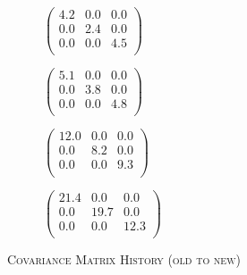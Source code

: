 \documentclass[english, master, utf8]{base/thesis_KBS}
\begin{document}
\begin{figure}[H]
    \begin{subfigure}[b]{0.24\textwidth}
    \centering
        $\left(
        \begin{array}{rrr}
        \boldsymbol{4.2} & 0.0 & 0.0 \\
        0.0 & \boldsymbol{2.4} & 0.0 \\
        0.0 & 0.0 & \boldsymbol{4.5} \\
        \end{array} \right) $
        \caption{\textsc{}}
        \label{fig:oldest}
    \end{subfigure}
    \hfill
    \begin{subfigure}[b]{0.24\textwidth}
    \centering
        $\left(
        \begin{array}{rrr}
        \boldsymbol{5.1} & 0.0 & 0.0 \\
        0.0 & \boldsymbol{3.8} & 0.0 \\
        0.0 & 0.0 & \boldsymbol{4.8} \\
        \end{array} \right) $
        \caption{\textsc{}}
        \label{fig:}
    \end{subfigure}
    \hfill
    \begin{subfigure}[b]{0.24\textwidth}
    \centering
        $\left(
        \begin{array}{rrr}
        \boldsymbol{12.0} & 0.0 & 0.0 \\
        0.0 & \boldsymbol{8.2} & 0.0 \\
        0.0 & 0.0 & \boldsymbol{9.3} \\
        \end{array} \right) $
        \caption{\textsc{}}
        \label{fig:}
    \end{subfigure}
    \hfill
    \begin{subfigure}[b]{0.24\textwidth}
    \centering
        $\left(
        \begin{array}{rrr}
        \boldsymbol{21.4} & 0.0 & 0.0 \\
        0.0 & \boldsymbol{19.7} & 0.0 \\
        0.0 & 0.0 & \boldsymbol{12.3} \\
        \end{array} \right) $
        \caption{\textsc{}}
        \label{fig:latest}
    \end{subfigure}
\caption{\textsc{Covariance Matrix History (old to new)}}
\label{fig:cov_history}
\end{figure}
\end{document}
